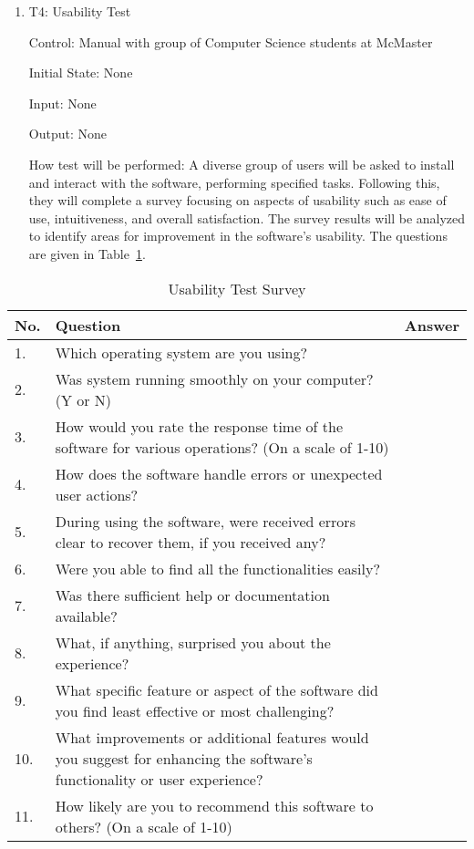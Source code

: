 \documentclass[12pt, titlepage]{article}
\begin{document}
\begin{enumerate}

  \item{T4: Usability Test\\}

  Control: Manual with group of Computer Science students at McMaster
  
  Initial State: None
  
  Input: None
  
  Output: None

  How test will be performed: A diverse group of users will be asked to install 
  and interact with the software, performing specified tasks. 
  Following this, they will complete a survey focusing on aspects of 
  usability such as ease of use, intuitiveness, and overall satisfaction. 
  The survey results will be analyzed to identify areas for improvement in the software's usability. 
  The questions are given in Table~\ref{UsabilitySurvey}.
\end{enumerate}

\begin{table}[h!]
  \begin{center}
  \begin{tabular}{ p{0.5cm}|p{10cm}|c }
  \hline
  No. &  Question   & Answer \\
  \hline
  1. & Which operating system are you using?  & \\
  2. & Was system running smoothly on your computer? (Y or N) & \\
  3. & How would you rate the response time of the software for various operations? (On a scale of 1-10) & \\
  4. & How does the software handle errors or unexpected user actions? & \\
  5. & During using the software, were received errors clear to recover them, if you received any? & \\
  6. & Were you able to find all the functionalities easily? & \\
  7. & Was there sufficient help or documentation available? & \\
  8. & What, if anything, surprised you about the experience? & \\
  9. & What specific feature or aspect of the software did you find least effective or most challenging? & \\
  10. & What improvements or additional features would you suggest for enhancing the software's functionality or user experience?  & \\
  11. & How likely are you to recommend this software to others? (On a scale of 1-10) & \\
  \hline
  \end{tabular}
  \caption{Usability Test Survey}
  \label{UsabilitySurvey}
  \end{center}
  \end{table}
\end{document}
